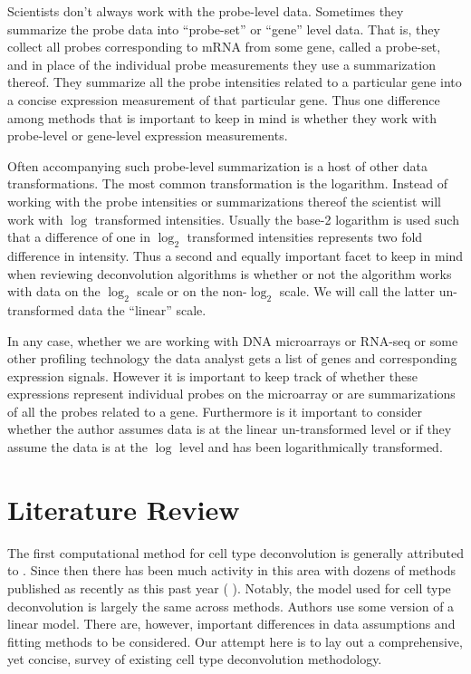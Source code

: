 \documentclass[reqno,12pt,oneside]{report}\usepackage[]{graphicx}\usepackage[]{color}
\renewcommand{\citet}[1]{(\citeauthor{#1} \citeyear{#1})}
\theoremstyle{plain}
\theoremstyle{definition}
\theoremstyle{remark}
\numberwithin{theorem}{chapter}     %
\begin{document}
Scientists don't always work with the probe-level data. Sometimes they summarize the probe data into ``probe-set'' or ``gene'' level data. That is, they collect all probes corresponding to mRNA from some gene, called a probe-set, and in place of the individual probe measurements they use a summarization thereof. They summarize all the probe intensities related to a particular gene into a concise expression measurement of that particular gene. Thus one difference among methods that is important to keep in mind is whether they work with probe-level or gene-level expression measurements. 

Often accompanying such probe-level summarization is a host of other data transformations. The most common transformation is the logarithm. Instead of working with the probe intensities or summarizations thereof the scientist will work with $\log$ transformed intensities. Usually the base-2 logarithm is used such that a difference of one in $\log_2$ transformed intensities represents two fold difference in intensity. Thus a second and equally important facet to keep in mind when reviewing deconvolution algorithms is whether or not the algorithm works with data on the $\log_2$ scale or on the non-$\log_2$ scale. We will call the latter un-transformed data the ``linear'' scale.

In any case, whether we are working with DNA microarrays or RNA-seq or some other profiling technology the data analyst gets a list of genes and corresponding expression signals. However it is important to keep track of whether these expressions represent individual probes on the microarray or are summarizations of all the probes related to a gene. Furthermore is it important to consider whether the author assumes data is at the linear un-transformed level or if they assume the data is at the $\log$ level and has been logarithmically transformed. 

 \chapter{Literature Review}
 \label{chap:Lit}

The first computational method for cell type deconvolution is generally attributed to \cite{Venet2001}. Since then there has been much activity in this area with dozens of methods published as recently as this past year \citet{Newman2015}. Notably, the model used for cell type deconvolution is largely the same across methods. Authors use some version of a linear model. There are, however, important differences in data assumptions and fitting methods to be considered. Our attempt here is to lay out a comprehensive, yet concise, survey of existing cell type deconvolution methodology.
\end{document}
